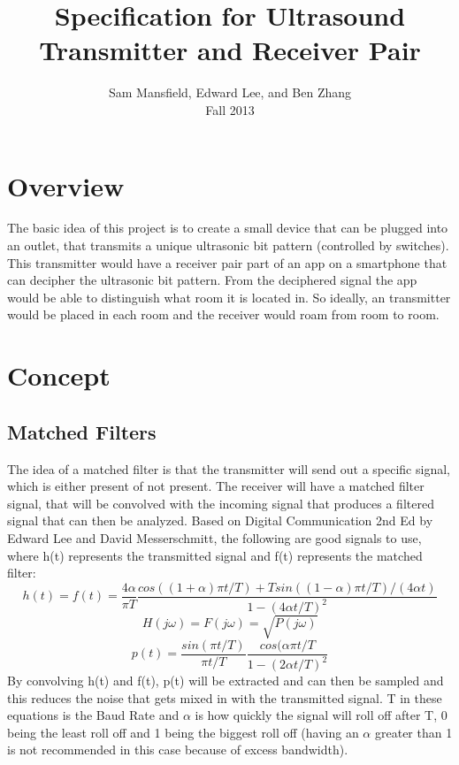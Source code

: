\documentclass[10pt]{article}
\begin{document}
  \title{Specification for Ultrasound Transmitter and Receiver Pair}
  \author{Sam Mansfield, Edward Lee, and Ben Zhang\\
          Fall 2013}
  \maketitle

  \section{Overview}
    The basic idea of this project is to create a small device that can be plugged into an outlet, that transmits a unique ultrasonic bit pattern (controlled by switches). This transmitter would have a receiver pair part of an app on a smartphone that can decipher the ultrasonic bit pattern. From the deciphered signal the app would be able to distinguish what room it is located in. So ideally, an transmitter would be placed in each room and the receiver would roam from room to room.
  
  \section{Concept}
    \subsection{Matched Filters}
      The idea of a matched filter is that the transmitter will send out a specific signal, which is either present of not present. The receiver will have a matched filter signal, that will be convolved with the incoming signal that produces a filtered signal that can then be analyzed. Based on Digital Communication 2nd Ed by Edward Lee and David Messerschmitt, the following are good signals to use, where h(t) represents the transmitted signal and f(t) represents the matched filter:
        \[h(t) = f(t) = \frac{4\alpha}{\pi T}\frac{cos((1 + \alpha)\pi t/T) + Tsin((1-\alpha)\pi t/T)/(4\alpha t)}{1 - (4\alpha t/T)^2}\]
        \[H(j\omega) = F(j\omega) = \sqrt{P(j\omega)}\]
        \[p(t) = \frac{sin(\pi t/T)}{\pi t/T}\frac{cos(\alpha \pi t/T}{1 - (2\alpha t/T)^2}\]
      By convolving h(t) and f(t), p(t) will be extracted and can then be sampled and this reduces the noise that gets mixed in with the transmitted signal. T in these equations is the Baud Rate and \(\alpha\) is how quickly the signal will roll off after T, 0 being the least roll off and 1 being the biggest roll off (having an \(\alpha\) greater than 1 is not recommended in this case because of excess bandwidth).
\end{document}
